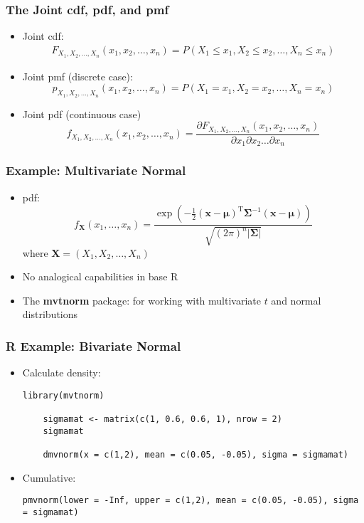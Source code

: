 \documentclass[10pt]{beamer}
\theoremstyle{definition}
\begin{document}
\begin{frame}[fragile]
\frametitle{The Joint cdf, pdf, and pmf}
\begin{itemize}
	\item Joint cdf:
	\[
		\begin{array}{lcl}
			F_{X_{1},X_{2},\ldots,X_{n}}(x_{1},x_{2},\ldots,x_{n}) = P(X_{1} \leq x_{1}, X_{2} 	\leq x_{2},\ldots, X_{n} \leq x_{n})
		\end{array}
	\]
	
	\item Joint pmf (discrete case):
	\[
		p_{X_{1},X_{2},\ldots,X_{n}}(x_{1},x_{2},\ldots,x_{n}) = P(X_{1} = x_{1}, X_{2} = x_{2},\ldots, X_{n} = x_{n})
	\]
	
	\item Joint pdf (continuous case)
	\[
		f_{X_{1},X_{2},\ldots,X_{n}}(x_{1},x_{2},\ldots,x_{n}) = \dfrac{\partial F_{X_{1},X_{2},\ldots,X_{n}}(x_{1},x_{2},\ldots,x_{n}) }{\partial x_{1}\partial x_{2}\ldots \partial x_{n}}
	\]
\end{itemize}
\end{frame}

\begin{frame}[fragile]
\frametitle{Example: Multivariate Normal}
\begin{itemize}
	\item pdf:
	\[
		f_{\mathbf X}(x_1,\ldots,x_{n}) = \frac{\exp\left(-\frac 1 2 ({\mathbf x}-{\boldsymbol\mu})^\mathrm{T}{\boldsymbol\Sigma}^{-1}({\mathbf x}-{\boldsymbol\mu})\right)}{\sqrt{(2\pi)^{n}|\boldsymbol\Sigma|}}
	\]
	where $\mathbf X = (X_{1}, X_{2},\ldots, X_{n})$

	\item No analogical capabilities in base R

	\item The \textbf{mvtnorm} package: for working with multivariate $t$ and normal distributions
\end{itemize}
\end{frame}

\begin{frame}[fragile]
\frametitle{R Example: Bivariate Normal}
\begin{itemize}
	\item Calculate density:
	\begin{lstlisting}[style = rstyle, breaklines]
	library(mvtnorm)
			
	sigmamat <- matrix(c(1, 0.6, 0.6, 1), nrow = 2)
	sigmamat
			
	dmvnorm(x = c(1,2), mean = c(0.05, -0.05), sigma = sigmamat)	
	\end{lstlisting}
	
	\item Cumulative:
	\begin{lstlisting}[style = rstyle, breaklines]
	pmvnorm(lower = -Inf, upper = c(1,2), mean = c(0.05, -0.05), sigma = sigmamat)	
	\end{lstlisting}
\end{itemize}
\end{frame}
\end{document}
